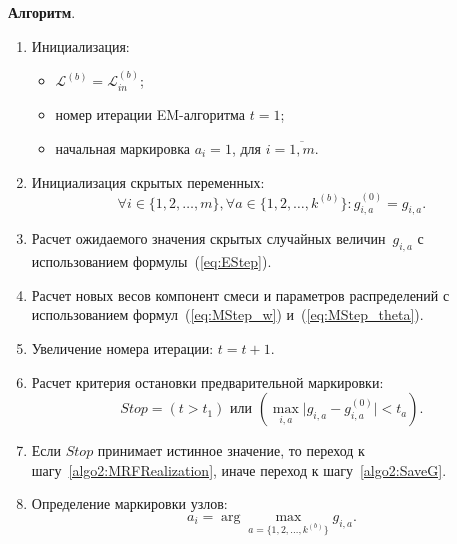 \textbf{Алгоритм}.
\begin{enumerate}
    \item\label{algo2:Init} Инициализация:
    \begin{itemize}
        \item $\mathcal{L}^{(b)} = \mathcal{L}_{in}^{(b)}$;
        \item номер итерации EM-алгоритма $t = 1$;
        \item начальная маркировка $a_i=1$, для $i=\overline{1,m}$.
    \end{itemize}
    
    \item\label{algo2:SaveG} Инициализация скрытых переменных:
    \begin{equation*} 
        \forall i \in \{1,2,\ldots,m\}, \forall a \in \{1,2,\ldots,k^{(b)}\}: g_{i,a}^{(0)} = g_{i,a}.
    \end{equation*}
    
    \item\label{algo2:EStep} Расчет ожидаемого значения скрытых случайных величин~$g_{i,a}$ с использованием формулы~(\ref{eq:EStep}).
    
    \item\label{algo2:MStep} Расчет новых весов компонент смеси и параметров распределений с использованием формул~(\ref{eq:MStep_w}) и~(\ref{eq:MStep_theta}).
    
    \item\label{algo2:IterInc} Увеличение номера итерации: $t=t+1$.
    
    \item\label{algo2:EMStopCalc} Расчет критерия остановки предварительной маркировки:
    \begin{equation*}
        Stop = (t > t_1)\text{ или }(\max_{i,a} \vert g_{i,a} - g_{i,a}^{(0)} \vert < t_a).
    \end{equation*}
    
    \item\label{algo2:EMStopAnalyze} Если $Stop$ принимает истинное значение, то переход к шагу~\ref{algo2:MRFRealization}, иначе переход к шагу~\ref{algo2:SaveG}.
    
    \item\label{algo2:MRFRealization} Определение маркировки узлов:
    \begin{equation}
        a_i = \arg\max_{a=\{1,2,\ldots,k^{(b)}\}} g_{i,a}.
    \end{equation}
    

\end{enumerate}
